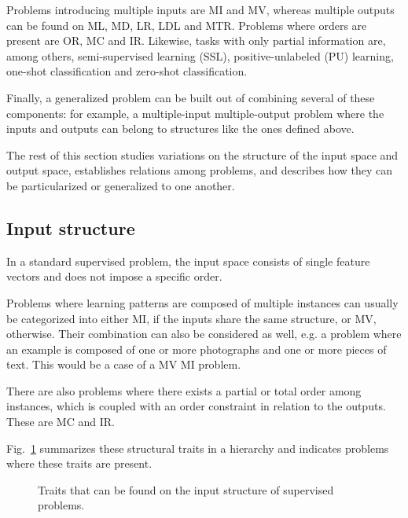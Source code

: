 Problems introducing multiple inputs are MI and MV, whereas multiple outputs can be found on ML, MD, LR, LDL and MTR. Problems where orders are present are OR, MC and IR. Likewise, tasks with only partial information are, among others, semi-supervised learning {(SSL), positive-unlabeled (PU) learning}, one-shot classification and zero-shot classification.

Finally, a generalized problem can be built out of combining several of these components: for example, a multiple-input multiple-output problem where the inputs and outputs can belong to structures like the ones defined above.

The rest of this section studies variations on the structure of the input space and output space, establishes relations among problems, and describes how they can be particularized or generalized to one another.

\subsection{Input structure}
\label{p3sec:multiinput}

In a standard supervised problem, the input space consists of single feature vectors and does not impose a specific order.

Problems where learning patterns are composed of multiple instances can usually be categorized into either MI, if the inputs share the same structure, or MV, otherwise. Their combination can also be considered as well, e.g. a problem where an example is composed of one or more photographs and one or more pieces of text. This would be a case of a MV MI problem.

There are also problems where there exists a partial or total order among instances, which is coupled with an order constraint in relation to the outputs. These are MC and IR.

Fig.~\ref{p3fig.minputstr} summarizes these structural traits in a hierarchy and indicates problems where these traits are present.

\begin{figure}[ht]
\centering\scriptsize
{}
\caption{\label{p3fig.minputstr}Traits that can be found on the input structure of supervised problems.}
\end{figure}

